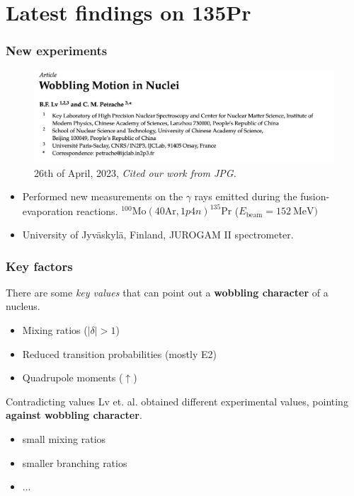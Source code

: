 \documentclass{beamer}
\begin{document}
\section{Latest findings on 135Pr}

\begin{frame}
	\frametitle{New experiments}
	\vspace{-0.4cm}
	\begin{figure}
		\centering
		\includegraphics[scale=0.28]{figures/new-wobbling-paper.pdf}
		\caption{26th of April, 2023, \emph{Cited our work from JPG.}}
	\end{figure}
	\vspace{-0.4cm}
	\begin{itemize}
		\item Performed new measurements on the $\gamma$ rays emitted during the fusion-evaporation reactions. $^{100}\text{Mo}\left(40\text{Ar},1p4n\right)^{135}\text{Pr}$ ($E_\text{beam}=152\ \text{MeV})$
		\item University of Jyväskylä, Finland, JUROGAM II spectrometer.
	\end{itemize}
\end{frame}

\begin{frame}
	\frametitle{Key factors}

	There are some \textit{key values} that can point out a \textbf{wobbling character} of a nucleus.
	\begin{itemize}
		\item Mixing ratios ($|\delta|>1$)
		\item Reduced transition probabilities (mostly E2)
		\item Quadrupole moments ($\uparrow$)
	\end{itemize} 
\begin{alertblock}{Contradicting values}
	Lv et. al. obtained different experimental values, pointing \textbf{against wobbling character}.
	\begin{itemize}
		\item small mixing ratios
		\item smaller branching ratios
		\item ...
	\end{itemize}
\end{alertblock}
\end{frame}
\end{document}

